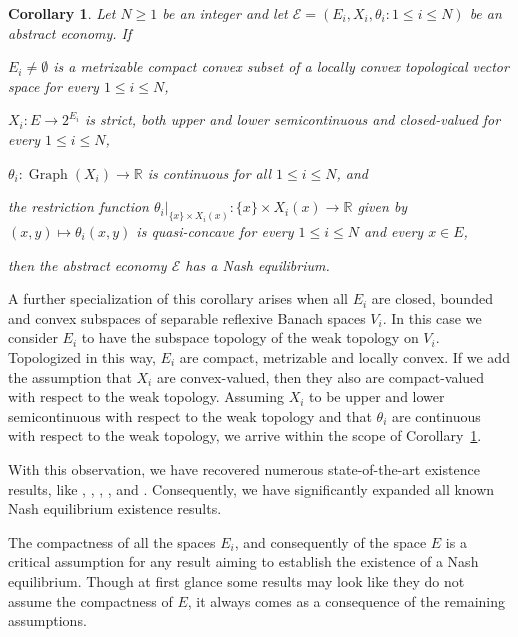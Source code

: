 \documentclass[a4paper,11pt,reqno,english]{amsart}
\newtheorem{corollary}[theorem]{Corollary}
\theoremstyle{definition}
\newcommand\R{\mathbb R}
\begin{document}
\begin{corollary}\label{cor:FunctionSpacesCorollary}
	Let $N\geq 1$ be an integer and let $\mathcal{E}=(E_i,X_i,\theta_i : 1\leq i\leq N)$ be an abstract economy.
	If
	\begin{compactenum}[\quad \rm(1)]
		\item  $E_i\neq \emptyset$ is a metrizable compact convex subset of a locally convex topological vector space for every $1\leq i \leq N$,
		\item  $X_i\colon E\longrightarrow 2^{E_i}$ is strict, both upper and lower semicontinuous and closed-valued for every $1\leq i \leq N$,
		\item $\theta_i\colon\operatorname{Graph}(X_i)\longrightarrow\R$ is continuous for all $1\leq i \leq N$, and
		\item the restriction function $\theta_i|_{\{x\}\times X_i(x)}\colon \{x\}\times X_i(x)\longrightarrow \R$ given by $(x,y)\longmapsto \theta_i(x,y)$ is quasi-concave for every $1\leq i \leq N$ and every $x\in E$,
	\end{compactenum}
	then the abstract economy $\mathcal{E}$ has a Nash equilibrium.
\end{corollary}

A further specialization of this corollary arises when all $E_i$ are closed, bounded and convex subspaces of separable reflexive Banach spaces $V_i$.
In this case we consider $E_i$ to have the subspace topology of the weak topology on $V_i$.
Topologized in this way, $E_i$ are compact, metrizable and locally convex.
If we add the assumption that $X_i$ are convex-valued, then they also are compact-valued with respect to the weak topology. Assuming $X_i$ to be upper and lower semicontinuous with respect to the weak topology and that $\theta_i$ are continuous with respect to the weak topology, we arrive within the scope of Corollary~\ref{cor:FunctionSpacesCorollary}.

With this observation, we have recovered numerous state-of-the-art existence results, like \cite[Thm.\,2.3]{Hintermueller2013}, \cite[Thm.\,3.4]{Hintermueller2015}, \cite[Sec.\,2]{Hintermueller2022}, \cite[Thm.\,5]{Hintermueller2023}, and \cite[Thm.\,4.1]{Hintermuller2023preprint}.
Consequently, we have significantly expanded all known Nash equilibrium existence results.

The compactness of all the spaces $E_i$, and consequently of the space $E$ is a critical assumption for any result aiming to establish the existence of a Nash equilibrium. Though at first glance some results may look like they do not assume the compactness of $E$, it always comes as a consequence of the remaining assumptions.
\end{document}
